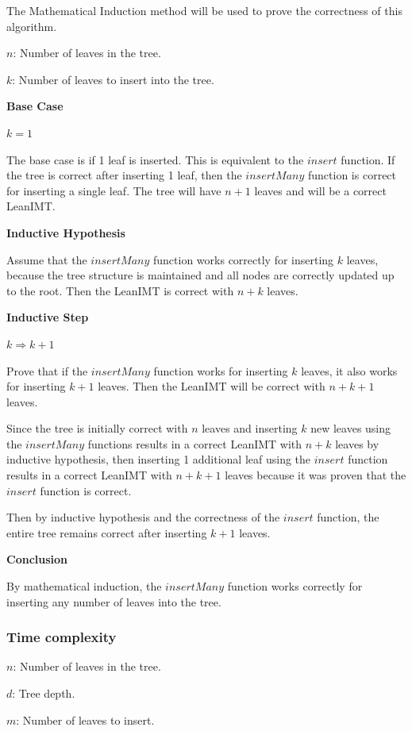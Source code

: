 \documentclass{article}
\begin{document}
The Mathematical Induction method will be used to prove the correctness of this algorithm.

$n$: Number of leaves in the tree.

$k$: Number of leaves to insert into the tree.

\textbf{Base Case}

$k=1$

The base case is if 1 leaf is inserted. This is equivalent to the $insert$ function.
If the tree is correct after inserting 1 leaf, then the $insertMany$ function is correct for inserting a single leaf.
The tree will have $n+1$ leaves and will be a correct LeanIMT.

\textbf{Inductive Hypothesis}

Assume that the $insertMany$ function works correctly for inserting $k$ leaves, because the tree structure is maintained and all nodes are correctly updated up to the root. Then the LeanIMT is correct with $n+k$ leaves.

\textbf{Inductive Step}

$k \Rightarrow k+1$

Prove that if the $insertMany$ function works for inserting $k$ leaves, it also works for inserting $k+1$ leaves. Then the LeanIMT will be correct with $n+k+1$ leaves.

Since the tree is initially correct with $n$ leaves and inserting $k$ new leaves using the $insertMany$ functions results in a correct LeanIMT with $n+k$ leaves by inductive hypothesis, then inserting 1 additional leaf using the $insert$ function results in a correct LeanIMT with $n+k+1$ leaves because it was proven that the $insert$ function is correct.

Then by inductive hypothesis and the correctness of the $insert$ function, the entire tree remains correct after inserting $k+1$ leaves.

\textbf{Conclusion}

By mathematical induction, the $insertMany$ function works correctly for inserting any number of leaves into the tree.

\subsubsection{Time complexity}

$n$: Number of leaves in the tree.

$d$: Tree depth.

$m$: Number of leaves to insert.
\end{document}

